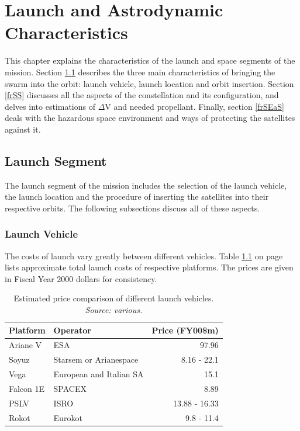 \chapter{Launch and Astrodynamic Characteristics}
\label{frLaAC}
This chapter explains the characteristics of the launch and space segments of the mission. Section \ref{frLS} describes the three main characteristics of bringing the swarm into the orbit: launch vehicle, launch location and orbit insertion. Section \ref{frSS} discusses all the aspects of the constellation and its configuration, and delves into estimations of $\Delta$V and needed propellant. Finally, section \ref{frSEaS} deals with the hazardous space environment and ways of protecting the satellites against it. 

\section{Launch Segment}
\label{frLS}

The launch segment of the mission includes the selection of the launch vehicle, the launch location and the procedure of inserting the satellites into their respective orbits. The following subsections discuss all of these aspects. 

\subsection{Launch Vehicle}
\label{frLSLV}

The costs of launch vary greatly between different vehicles. Table \ref{table:vehicleCosts} on page \pageref{table:vehicleCosts} lists approximate total launch costs of respective platforms. The prices are given in Fiscal Year 2000 dollars for consistency.
\begin{table}[h]
\begin{centering}
\begin{tabular}{llr}
\toprule
Platform & Operator & Price (FY00\$m) \\
\hline \hline
Ariane V  & ESA & 97.96 \\
Soyuz   & Starsem or Arianespace&  8.16 - 22.1 \\
Vega   & European and Italian SA  & 15.1 \\
Falcon 1E  & SPACEX  & 8.89 \\
PSLV & ISRO & 13.88 - 16.33 \\
Rokot & Eurokot & 9.8 - 11.4 \\
\bottomrule
\end{tabular}
\caption{Estimated price comparison of different launch vehicles. \emph{Source: various.}}
\label{table:vehicleCosts}
\end{centering}
\end{table}

